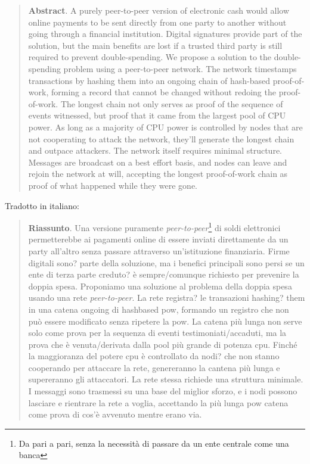 \documentclass {article}
\begin{document}
\begin {quote}

\textbf {Abstract}. A purely peer-to-peer version of electronic cash would allow online payments to be sent directly from one party to another without going through a financial institution.
Digital signatures provide part of the solution, but the main benefits are lost if a trusted third party is still required to prevent double-spending.
We propose a solution to the double-spending problem using a peer-to-peer network.
The network timestamps transactions by hashing them into an ongoing chain of hash-based proof-of-work, forming a record that cannot be changed without redoing the proof-of-work.
The longest chain not only serves as proof of the sequence of events witnessed, but proof that it came from the largest pool of CPU power.
As long as a majority of CPU power is controlled by nodes that are not cooperating to attack the network, they'll generate the longest chain and outpace attackers.
The network itself requires minimal structure.
Messages are broadcast on a best effort basis, and nodes can leave and rejoin the network at will, accepting the longest proof-of-work chain as proof of what happened while they were gone.

\end {quote}
%
Tradotto in italiano:

\begin {quote}

\textbf {Riassunto}. Una versione puramente \textit{peer-to-peer}\footnote{Da pari a pari, senza la necessità di passare da un ente centrale come una banca} di soldi elettronici permetterebbe ai pagamenti online di essere inviati direttamente da un party all'altro senza passare attraverso un'istituzione finanziaria.
Firme digitali sono? parte della soluzione, ma i benefici principali sono persi se un ente di terza parte creduto? è sempre/comunque richiesto per prevenire la doppia spesa.
Proponiamo una soluzione al problema della doppia spesa usando una rete \textit{peer-to-peer}.
La rete registra? le transazioni hashing? them in una catena ongoing di hashbased pow, formando un registro che non può essere modificato senza ripetere la pow.
La catena più lunga non serve solo come prova per la sequenza di eventi testimoniati/accaduti, ma la prova che è venuta/derivata dalla pool più grande di potenza cpu. Finché la maggioranza del potere cpu è controllato da nodi? che non stanno cooperando per attaccare la rete, genereranno la cantena più lunga e supereranno gli attaccatori.
La rete stessa richiede una struttura minimale.
I messaggi sono trasmessi su una base del miglior sforzo, e i nodi possono lasciare e rientrare la rete a voglia, accettando la più lunga pow catena come prova di cos'è avvenuto mentre erano via.

\end {quote}
\end{document}
